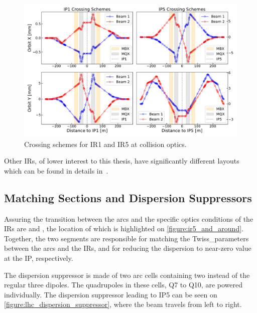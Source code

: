 \begin{figure}[!hbt]
  \centering
  \includegraphics*[width=\linewidth]{Figures/Optics_Measurements_Corrections_at_LHC/lhc_crossing_schemes_ip15.pdf}
  \caption{Crossing schemes for IR\num{1} and IR\num{5} at collision optics.}
  \label{figure:lhc_crossing_schemes_ip15}
\end{figure}

Other IRs, of lower interest to this thesis, have significantly different layouts which can be found in details in~\cite{BOOK:Bruning:LHC_Design_Report_Main_Ring,PHD:Vanbavinckhove}.

\subsection{Matching Sections and Dispersion Suppressors}
\label{subsection:matching_sections_dispersion_suppressors}

Assuring the transition between the arcs and the specific \gls{optics} conditions of the \glspl{IR} are  and , the location of which is highlighted on \cref{figure:ir5_and_around}.
Together, the two segments are responsible for matching the \gls{Twiss_parameters} between the arcs and the IRs, and for reducing the dispersion to near-zero value at the IP, respectively.

The dispersion suppressor is made of two arc cells containing two instead of the regular three dipoles.
The quadrupoles in these cells, Q\num{7} to Q\num{10}, are powered individually.
The dispersion suppressor leading to IP\num{5} can be seen on \cref{figure:lhc_dispersion_suppressor}, where the beam travels from left to right.

